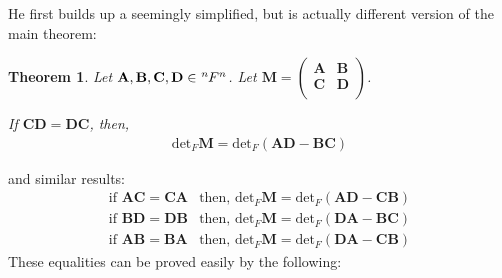 \documentclass{article}
\numberwithin{equation}{subsection} %
\newtheorem{thm}{Theorem}[section]
\theoremstyle{definition}
\begin{document}
        He first builds up a seemingly simplified, but is actually
        different version of the main theorem:
        \begin{thm}
            \label{thm:sec_1.1.1_thm3}
            Let $\mathbf{A,B,C,D}\in \tensor[^n]{F}{^n}$. 
            Let $\mathbf{M}=\left(
                \begin{array}{cc}
                \mathbf{A} & \mathbf{B} \\
                \mathbf{C} & \mathbf{D} \\
                \end{array}
                \right)$.
            
            If
            $\mathbf{CD=DC}$, then,
            \begin{align}
                \text{det}_F \mathbf{M}= 
                \text{det}_F (\mathbf{AD-BC})
            \end{align}
        \end{thm}
        and similar results:
        \begin{align}
            \label{eq:sec1.1.1_thm3_similar}
            \text{if } \mathbf{AC=CA} &\text{then, }
                \text{det}_F \mathbf{M}= \text{det}_F (\mathbf{AD-CB})
            \\
            \text{if } \mathbf{BD=DB} &\text{then, }
                \text{det}_F \mathbf{M}= \text{det}_F (\mathbf{DA-BC})
            \\
            \text{if } \mathbf{AB=BA} &\text{then, }
                \text{det}_F \mathbf{M}= \text{det}_F (\mathbf{DA-CB})
        \end{align}
        These equalities can be proved easily by the following:
\end{document}
